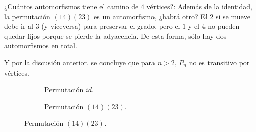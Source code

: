 \begin{ejem}
    ¿Cuántos automorfismos tiene el camino de $4$ vértices?: Además de la identidad, la permutación $(14)(23)$ es un automorfismo, ¿habrá otro? El $2$ si se mueve debe ir al $3$ (y viceversa) para preservar el grado, pero el $1$ y el $4$ no pueden quedar fijos porque se pierde la adyacencia. De esta forma, sólo hay dos automorfismos en total.
    
    Y por la discusión anterior, se concluye que para $n > 2$, $P_n$ no es transitivo por vértices.
    
    \begin{figure}
        \begin{subfigure}[b]{0.5\textwidth}
        \centering
            \caption{Permutación $id$.}
        \end{subfigure}
        \hfill
        \begin{subfigure}[b]{0.5\textwidth}
        \centering
            \caption{Permutación $(14)(23)$.}
        \end{subfigure}
    \end{figure}
\end{ejem}

